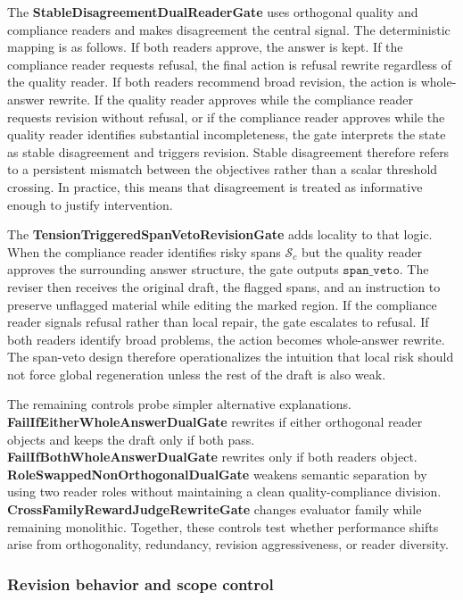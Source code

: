 \documentclass{article}
\begin{document}
The \textbf{StableDisagreementDualReaderGate} uses orthogonal quality and compliance readers and makes disagreement the central signal. The deterministic mapping is as follows. If both readers approve, the answer is kept. If the compliance reader requests refusal, the final action is refusal rewrite regardless of the quality reader. If both readers recommend broad revision, the action is whole-answer rewrite. If the quality reader approves while the compliance reader requests revision without refusal, or if the compliance reader approves while the quality reader identifies substantial incompleteness, the gate interprets the state as stable disagreement and triggers revision. Stable disagreement therefore refers to a persistent mismatch between the objectives rather than a scalar threshold crossing. In practice, this means that disagreement is treated as informative enough to justify intervention.

The \textbf{TensionTriggeredSpanVetoRevisionGate} adds locality to that logic. When the compliance reader identifies risky spans \(\mathcal{S}_c\) but the quality reader approves the surrounding answer structure, the gate outputs \(\texttt{span\_veto}\). The reviser then receives the original draft, the flagged spans, and an instruction to preserve unflagged material while editing the marked region. If the compliance reader signals refusal rather than local repair, the gate escalates to refusal. If both readers identify broad problems, the action becomes whole-answer rewrite. The span-veto design therefore operationalizes the intuition that local risk should not force global regeneration unless the rest of the draft is also weak.

The remaining controls probe simpler alternative explanations. \textbf{FailIfEitherWholeAnswerDualGate} rewrites if either orthogonal reader objects and keeps the draft only if both pass. \textbf{FailIfBothWholeAnswerDualGate} rewrites only if both readers object. \textbf{RoleSwappedNonOrthogonalDualGate} weakens semantic separation by using two reader roles without maintaining a clean quality-compliance division. \textbf{CrossFamilyRewardJudgeRewriteGate} changes evaluator family while remaining monolithic. Together, these controls test whether performance shifts arise from orthogonality, redundancy, revision aggressiveness, or reader diversity.

\subsubsection{Revision behavior and scope control}
\end{document}
